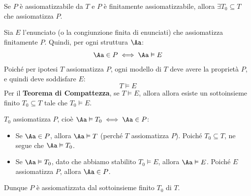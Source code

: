 \documentclass[a4paper,11pt]{report}
\begin{document}
\begin{lemmaframe}{}{}
    Se \( P \) è assiomatizzabile da \( T \) e \( P \) è finitamente assiomatizzabile, allora \( \exists T_0 \subseteq T \) che assiomatizza \( P \).
\end{lemmaframe}

\begin{pframe}
    Sia $E$ l'enunciato (o la congiunzione finita di enunciati) che assiomatizza finitamente $P$.
    Quindi, per ogni struttura $\Aa$:
    \[ \Aa \in P \iff \Aa \vDash E \]
    Poiché per ipotesi $T$ assiomatizza $P$, ogni modello di $T$ deve avere la proprietà $P$, e quindi deve soddisfare $E$:
    \[ T \vDash E \]
    Per il \textbf{Teorema di Compattezza}, se $T\vDash E$, allora allora esiste un sottoinsieme finito $T_0 \subseteq T$ tale che $T_0 \vDash E$.

    $T_0$ assiomatizza $P$, cioè $\Aa \vDash T_0 \iff \Aa \in P$:
    \begin{itemize}
        \item[($\Leftarrow$)] Se $\Aa \in P$, allora $\Aa \vDash T$ (perché $T$ assiomatizza $P$). Poiché $T_0 \subseteq T$, ne segue che $\Aa \vDash T_0$.
        \item[($\Rightarrow$)] Se $\Aa \vDash T_0$, dato che abbiamo stabilito $T_0 \vDash E$, allora $\Aa \vDash E$. Poiché $E$ assiomatizza $P$, allora $\Aa \in P$.
    \end{itemize}
    Dunque $P$ è assiomatizzata dal sottoinsieme finito $T_0$ di $T$.
\end{pframe}
\end{document}
